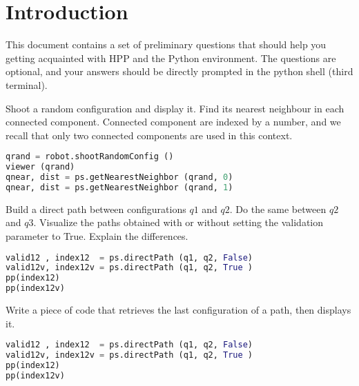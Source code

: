 \documentclass[10pt]{exam}
\begin{document}

\section{Introduction}
This document contains a set of preliminary questions that should help you getting acquainted with HPP and the Python environment.
The questions are optional, and your answers should be directly prompted in the python shell (third terminal).


\begin{questions}
\question Shoot a random configuration and display it. Find its nearest neighbour in each connected component. Connected component are indexed by a number, and we recall
that only two connected components are used in this context.

\begin{solutionorlines}
\begin{lstlisting}[language=python]
qrand = robot.shootRandomConfig ()
viewer (qrand)
qnear, dist = ps.getNearestNeighbor (qrand, 0)
qnear, dist = ps.getNearestNeighbor (qrand, 1)
\end{lstlisting}
\end{solutionorlines}

\question Build a direct path between configurations $q1$ and $q2$. Do the same between $q2$ and $q3$. Visualize the paths obtained with or without
setting the validation parameter to True. Explain the differences.
\begin{solutionorlines}
\begin{lstlisting}[language=python]
valid12 , index12  = ps.directPath (q1, q2, False)
valid12v, index12v = ps.directPath (q1, q2, True )
pp(index12)
pp(index12v)
\end{lstlisting}
\end{solutionorlines}

\question Write a piece of code that retrieves the last configuration of a path, then displays it.
\begin{solutionorlines}
\begin{lstlisting}[language=python]
valid12 , index12  = ps.directPath (q1, q2, False)
valid12v, index12v = ps.directPath (q1, q2, True )
pp(index12)
pp(index12v)
\end{lstlisting}
\end{solutionorlines}


\end{questions}
\end{document}
